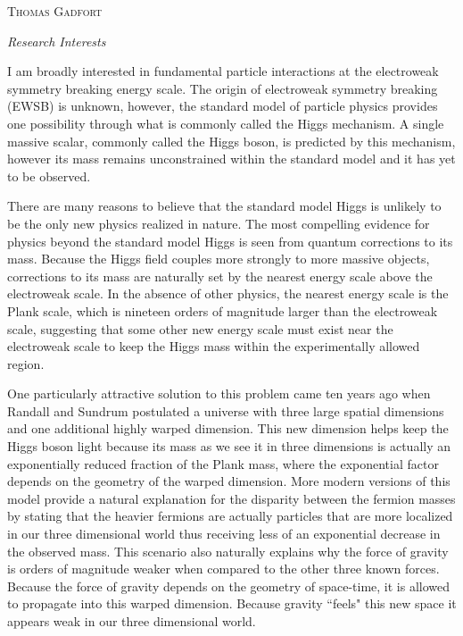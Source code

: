 \documentclass[12pt]{article}
\newcommand{\hr}{\centerline{\hskip 30mm\hrulefill\hskip 30mm}}
\begin{document}
\begin{center}
{\LARGE \textsc{Thomas Gadfort}}
\smallskip

\emph{Research Interests}
\end{center}

\vspace{-11pt}
\hr

\bigskip
 
I am broadly interested in fundamental particle interactions at the electroweak symmetry breaking energy scale. The origin of electroweak symmetry breaking (EWSB) is unknown, however, the standard model of particle physics provides one possibility through what is commonly called the Higgs mechanism. A single massive scalar, commonly called the Higgs boson, is predicted by this mechanism, however its mass remains unconstrained within the standard model and it has yet to be observed.

There are many reasons to believe that the standard model Higgs is unlikely to be the only new physics realized in nature. The most compelling evidence for physics beyond the standard model Higgs is seen from quantum corrections to its mass. Because the Higgs field couples more strongly to more massive objects, corrections to its mass are naturally set by the nearest energy scale above the electroweak scale. In the absence of other physics, the nearest energy scale is the Plank scale, which is nineteen orders of magnitude larger than the electroweak scale, suggesting that some other new energy scale must exist near the electroweak scale to keep the Higgs mass within the experimentally allowed region.

One particularly attractive solution to this problem came ten years ago when Randall and Sundrum postulated a universe with three large spatial dimensions and one additional highly warped dimension. This new dimension helps keep the Higgs boson light because its mass as we see it in three dimensions is actually an exponentially reduced fraction of the Plank mass, where the exponential factor depends on the geometry of the warped dimension. More modern versions of this model provide a natural explanation for the disparity between the fermion masses by stating that the heavier fermions are actually particles that are more localized in our three dimensional world thus receiving less of an exponential decrease in the observed mass. This scenario also naturally explains why the force of gravity is orders of magnitude weaker when compared to the other three known forces. Because the force of gravity depends on the geometry of space-time, it is allowed to propagate into this warped dimension. Because gravity ``feels" this new space it appears weak in our three dimensional world.
\end{document}
